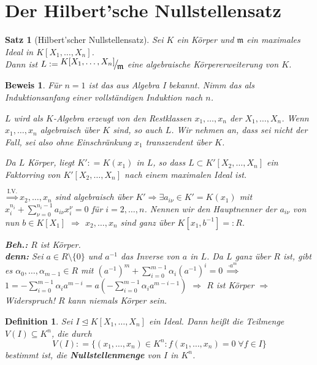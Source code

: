 \documentclass[a4paper,12pt]{scrbook}
\theoremstyle{break}
\newtheorem{Satz}{Satz}
\newtheorem{Def}{Definition}[chapter]
\theoremstyle{nonumberbreak}
\newtheorem{Bew}{Beweis}
\theoremstyle{nonumberplain}
\newcommand{\emp}[1]{\textbf{\emph{#1}}}
\newcommand{\defeqr}[0]{\mathrel{\mathop:}=}
\newcommand{\defeql}[0]{=\mathrel{\mathop:}}
\newcommand{\FakRaum}[2]{
  \raisebox{0.7ex}{\ensuremath{#1}}
  \ensuremath{\mkern-3mu}\big/\ensuremath{\mkern-3mu}
  \raisebox{-0.6ex}{\ensuremath{#2}}}
\begin{document}
\section{Der Hilbert'sche Nullstellensatz}

\begin{Satz}[Hilbert'scher Nullstellensatz]
\label{Satz5}
Sei $K$ ein Körper und $\mathfrak{m}$ ein maximales Ideal in $K[X_1, \dots,
X_n]$.\\
Dann ist $L \defeqr \FakRaum{K[X_1, \dots, X_n]}{\mathfrak{m}}$ eine
algebraische Körpererweiterung von $K$.
\end{Satz}

\begin{Bew}
  Für $n=1$ ist das aus Algebra I bekannt. Nimm das als Induktionsanfang einer
  vollständigen Induktion nach $n$.

  $L$ wird als $K$-Algebra erzeugt von den Restklassen $x_1, \dots, x_n$ der
  $X_1, \dots, X_n$. Wenn $x_1, \dots, x_n$ algebraisch über $K$ sind, so auch
  $L$. Wir nehmen an, dass sei nicht der Fall, sei also ohne Einschränkung
  $x_1$ transzendent über $K$.

  Da $L$ Körper, liegt $K' \defeqr K(x_1)$ in $L$, so dass $L \subset K'[X_2,
  \dots, X_n]$ ein Faktorring von $K'[X_2, \dots, X_n]$ nach einem maximalen
  Ideal ist.

  $\overset{\text{I.V.}}{\Rightarrow} x_2, \dots, x_n$ sind algebraisch über $K'
  \Rightarrow \exists a_{i \nu} \in K'=K(x_1)$ mit $x_i^{n_i} + \sum_{\nu =
  0}^{n_i -1} a_{i \nu} x_i^{\nu} = 0$ für $i = 2, \dots, n$.
  Nennen wir den Hauptnenner der $a_{i \nu}$ von nun $b \in K[X_1]$ $\Rightarrow$
  $x_2, \dots, x_n$ sind ganz über $K[x_1, b^{-1}] \defeql R$.

  \textbf{Beh.:} $R$ ist Körper.\\
  \textbf{denn:} Sei $a \in R \setminus \{0\}$ und $a^{-1}$ das Inverse von $a$
  in $L$. Da $L$ ganz über $R$ ist, gibt es $\alpha_0, \dots, \alpha_{m-1} \in
  R$ mit $(a^{-1})^m + \sum_{i = 0}^{m-1} \alpha_i (a^{-1})^i = 0$ $\overset{
  \cdot a^m}{\Rightarrow}$ $1 = -\sum_{i=0}^{m-1} \alpha_i a^{m-i} = a
  (-\sum_{i=0}^{m-1} \alpha_i a^{m-i-1})$ $\Rightarrow$ $R$ ist Körper $\Rightarrow$
  Widerspruch! $R$ kann niemals Körper sein.
\end{Bew}

\begin{Def}
  Sei $I \trianglelefteq K[X_1, \dots, X_n]$ ein Ideal. Dann heißt die Teilmenge
  $V(I) \subseteq K^n$, die durch
  $$V(I) \defeqr \{(x_1, \dots, x_n) \in K^n: f(x_1, \dots, x_n) = 0 \; \forall f \in I\}$$
  bestimmt ist, die \emp{Nullstellenmenge} von $I$ in $K^n$.
\end{Def}
\end{document}
